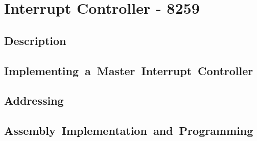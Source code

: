 \newpage
\section{Interrupt Controller - 8259}

    \subsection{Description}

    \subsection{Implementing a Master Interrupt Controller}

    \subsection{Addressing}

    \subsection{Assembly Implementation and Programming}
